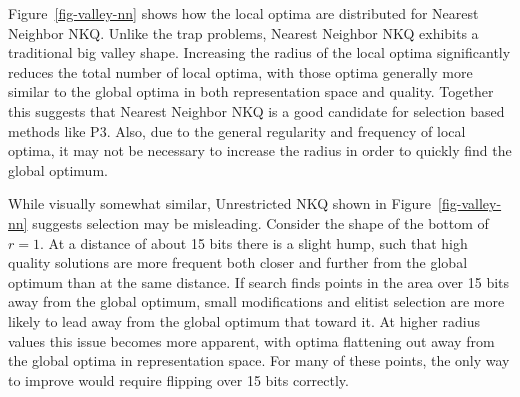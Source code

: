\begin{figure*}
  \centering
  \caption{Location and quality of local optima in comparison to the global optima for a representative Nearest Neighbor NKQ problem
           with $N=60$ and $k=2$.}
  \label{fig-valley-nn}
\end{figure*}

Figure~\ref{fig-valley-nn} shows how the local optima are distributed for Nearest Neighbor NKQ. Unlike the trap problems,
Nearest Neighbor NKQ exhibits a traditional big valley shape. Increasing the radius of the local optima significantly
reduces the total number of local optima, with those optima generally more similar to the global optima in both representation
space and quality. Together this suggests that Nearest Neighbor NKQ is a good candidate for selection based methods like P3. Also,
due to the general regularity and frequency of local optima, it may not be necessary to increase the radius in order to quickly find
the global optimum.

\begin{figure*}
  \centering
  \caption{Location and quality of local optima in comparison to the global optima for a representative Unrestricted NKQ problem
           with $N=60$ and $k=2$.}
  \label{fig-valley-un}
\end{figure*}

While visually somewhat similar, Unrestricted NKQ shown in Figure~\ref{fig-valley-nn} suggests selection may be misleading.
Consider the shape of the bottom of $r=1$. At a distance of about 15 bits there is a slight hump, such that high quality solutions
are more frequent both closer and further from the global optimum than at the same distance.
If search finds points in the area over 15 bits away from the global optimum, small modifications and elitist selection
are more likely to lead away from the global optimum that toward it.
At higher radius values this issue becomes more apparent, with optima flattening out away
from the global optima in representation space. For many of these points, the only way to improve would require flipping over 15 bits
correctly.

\begin{figure*}
  \centering
  \caption{Location and quality of local optima in comparison to the global optima for a representative Ising Spin Glass problem
           with $N=36$.}
  \label{fig-valley-is}
\end{figure*}

